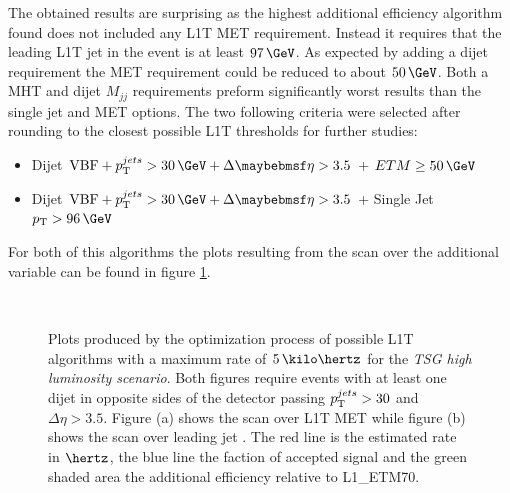 The obtained results are surprising as the highest additional efficiency algorithm found does not included any \gls{L1T} \gls{MET} requirement. Instead it requires that the leading \gls{L1T} jet in the event is at least $97\,\GeV$. As expected by adding a dijet requirement  the \gls{MET} requirement could be reduced to about $50\,\GeV$. Both a \gls{MHT} and dijet $M_{jj}$ requirements preform significantly worst results than the single jet and \gls{MET} options. The two following criteria were selected after rounding to the closest possible \gls{L1T} thresholds for further studies:


\begin{itemize}
  \item Dijet $\text{VBF} + \pt^{jets}>30\,\GeV + \Delta\eta>3.5$ + $ETM \geq 50\,\GeV$
  \item Dijet $\text{VBF} + \pt^{jets}>30\,\GeV + \Delta\eta>3.5$ + Single Jet $\pt>96\,\GeV$ 
\end{itemize}

For both of this algorithms the plots resulting from the scan over the additional variable can be found in figure \ref{FIGURE:RunIIPreparation_L1TAlgorithmDevelopment_VariableScan}. 

\begin{figure}[!htp]%
\centering
{}
\\
\caption{Plots produced by the optimization process of possible \gls{L1T} algorithms with a maximum rate of $5\,\kilo\hertz$ for the \textit{\gls{TSG} high luminosity scenario}. Both figures require events with at least one dijet in opposite sides of the detector passing $p_{\mathrm{T}}^{jets}>30$ and $\Delta\eta>3.5$. Figure (a) shows the scan over \gls{L1T} \gls{MET} while figure (b) shows the scan over leading jet \pt. The red line is the estimated rate in $\hertz$, the blue line the faction of accepted signal and the green shaded area the additional efficiency relative to L1\_ETM70.}
\label{FIGURE:RunIIPreparation_L1TAlgorithmDevelopment_VariableScan}
\end{figure}

